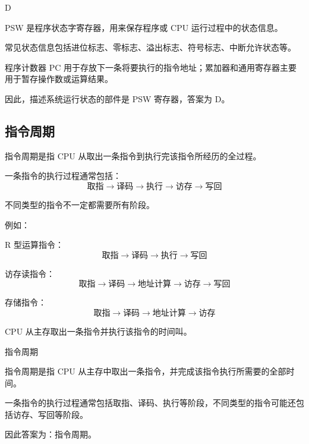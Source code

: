\begin{answer}
D
\end{answer}

\begin{analysisenv}
PSW 是程序状态字寄存器，用来保存程序或 CPU 运行过程中的状态信息。

常见状态信息包括进位标志、零标志、溢出标志、符号标志、中断允许状态等。

程序计数器 PC 用于存放下一条将要执行的指令地址；累加器和通用寄存器主要用于暂存操作数或运算结果。

因此，描述系统运行状态的部件是 PSW 寄存器，答案为 D。
\end{analysisenv}








\subsection{指令周期}

\begin{knowledge}
指令周期是指 CPU 从取出一条指令到执行完该指令所经历的全过程。

一条指令的执行过程通常包括：
\[
\text{取指} \rightarrow \text{译码} \rightarrow \text{执行} \rightarrow \text{访存} \rightarrow \text{写回}
\]

不同类型的指令不一定都需要所有阶段。

例如：

R 型运算指令：
\[
\text{取指} \rightarrow \text{译码} \rightarrow \text{执行} \rightarrow \text{写回}
\]

访存读指令：
\[
\text{取指} \rightarrow \text{译码} \rightarrow \text{地址计算} \rightarrow \text{访存} \rightarrow \text{写回}
\]

存储指令：
\[
\text{取指} \rightarrow \text{译码} \rightarrow \text{地址计算} \rightarrow \text{访存}
\]
\end{knowledge}



\begin{question}
CPU 从主存取出一条指令并执行该指令的时间叫\underline{\hspace{3cm}}。
\end{question}

\begin{answer}
指令周期
\end{answer}

\begin{analysisenv}
指令周期是指 CPU 从主存中取出一条指令，并完成该指令执行所需要的全部时间。

一条指令的执行过程通常包括取指、译码、执行等阶段，不同类型的指令可能还包括访存、写回等阶段。

因此答案为：指令周期。
\end{analysisenv}



